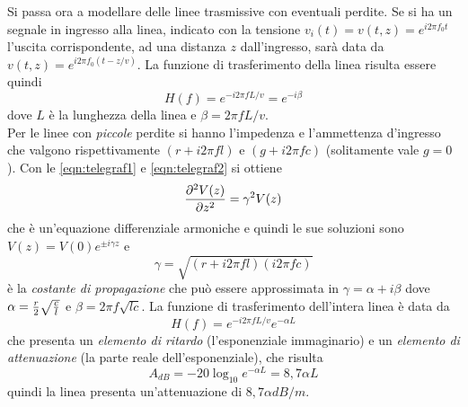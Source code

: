 \documentclass[a4paper,portrait,12pt]{article}
\theoremstyle{definition}
\begin{document}
Si passa ora a modellare delle linee trasmissive con eventuali perdite. Se si ha un segnale in ingresso 
alla linea, indicato con la tensione $v_i(t) = v(t,z) = e^{i2\pi f_0 t}$ l'uscita corrispondente, 
ad una distanza $z$ dall'ingresso, sarà data da $v(t,z) = e^{i2\pi f_0 (t-z/v)}$. La funzione di 
trasferimento della linea risulta essere quindi
\begin{equation}
H(f) = e^{-i2\pi f L/v} = e^{-i\beta}
\end{equation}
dove $L$ è la lunghezza della linea e $\beta = 2\pi f L/v$.\\

Per le linee con \textit{piccole} perdite si hanno l'impedenza e l'ammettenza d'ingresso che valgono
rispettivamente $(r + i 2\pi f l)$ e $(g + i 2\pi f c)$ (solitamente vale $g = 0$). Con le \ref{eqn:telegraf1}
e \ref{eqn:telegraf2} si ottiene
\begin{equation}
{\partial^2 V(z) \over \partial z^2} = \gamma^2 V(z)
\end{equation}
che è un'equazione differenziale armoniche e quindi le sue soluzioni sono $V(z) = V(0) e^{\pm i \gamma z}$ e
\begin{equation}
\gamma = \sqrt{(r + i 2\pi f l)(i 2\pi f c)}
\end{equation}
è la \textit{costante di propagazione} che può essere approssimata in $\gamma = \alpha + i\beta$ dove 
$\alpha = {r\over 2} \sqrt{c \over l}$ e $\beta = 2\pi f \sqrt{lc}$. La funzione di trasferimento dell'intera 
linea è data da
\begin{equation}
\label{eqn:tf_linea}
H(f) = e^{-i2\pi f L/v} e^{-\alpha L}
\end{equation}
che presenta un \textit{elemento di ritardo} (l'esponenziale immaginario) e un \textit{elemento di 
attenuazione} (la parte reale dell'esponenziale), che risulta
\begin{equation}
A_{dB} = -20 \log_{10} e^{-\alpha L} = 8,7 \alpha L
\end{equation}
quindi la linea presenta un'attenuazione di $8,7 \alpha dB/m$.\\
\end{document}
